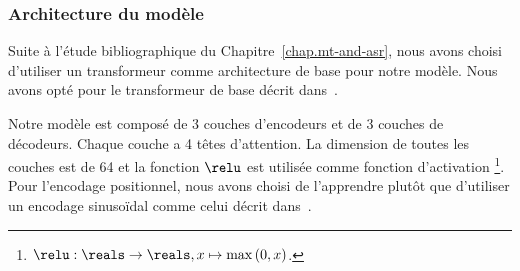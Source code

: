 \subsubsection{Architecture du modèle}

Suite à l'étude bibliographique du Chapitre~\ref{chap.mt-and-asr}, 
nous avons choisi d'utiliser un transformeur comme architecture de base pour notre modèle.
Nous avons opté pour le transformeur de base décrit dans~\cite{attention}.

Notre modèle est composé de 3 couches d'encodeurs et de 3 couches de décodeurs.
Chaque couche a 4 têtes d'attention.
La dimension de toutes les couches est de 64
et la fonction \(\relu\) est utilisée comme fonction d'activation%
\footnote{\(\relu: \reals\to\reals, x\mapsto \max{(0, x)}\).}.
Pour l'encodage positionnel, nous avons choisi de l'apprendre plutôt que d'utiliser un encodage sinusoïdal
comme celui décrit dans~\cite{attention}.

